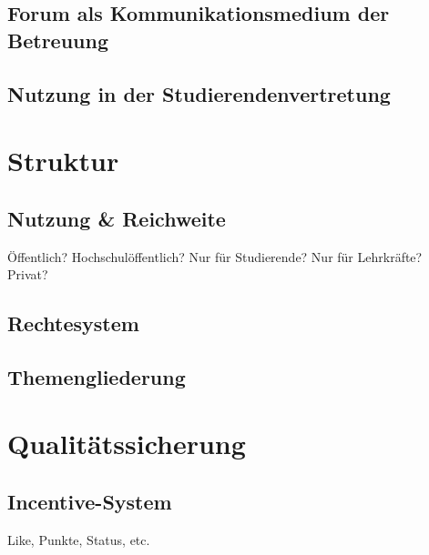 \subsection{Forum als Kommunikationsmedium der Betreuung} %
\label{sub:forum_als_kommunikationsmedium_der_betreuung}


\subsection{Nutzung in der Studierendenvertretung} %
\label{sub:nutzung_in_der_studierendenvertretung}



\section{Struktur} %
\label{sec:struktur}

\subsection{Nutzung \& Reichweite} %
\label{sub:reichweite}
Öffentlich? Hochschulöffentlich? Nur für Studierende? Nur für Lehrkräfte? Privat?

\subsection{Rechtesystem} %
\label{sub:rechtesystem}


\subsection{Themengliederung} %
\label{sub:themengliederung}



\section{Qualitätssicherung} %
\label{sec:qualitatssicherung}

\subsection{Incentive-System} %
\label{sub:incentive_system}
Like, Punkte, Status, etc.

